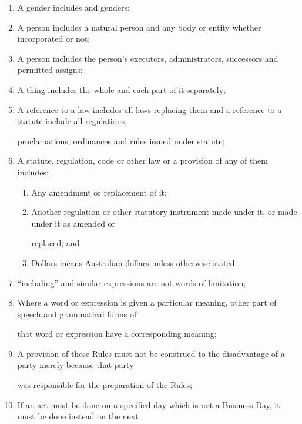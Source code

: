 \documentclass{article}
\begin{document}
\begin{enumerate}[label=\arabic*.]
\begin{enumerate}[label=\arabic{enumi}.\arabic*.]
\begin{enumerate}[label=(\arabic*)]
\item  A gender includes and genders; 

\item  A person includes a natural person and any body or entity whether incorporated or not; 

\item  A person includes the person’s executors, administrators, successors and permitted assigns; 

\item  A thing includes the whole and each part of it separately; 

\item  A reference to a law includes all laws replacing them and a reference to a statute include all regulations, 

proclamations, ordinances and rules issued under statute; 

\item  A statute, regulation, code or other law or a provision of any of them includes: 

\begin{enumerate}[label=(\alph*)]
\item  Any amendment or replacement of it; 

\item  Another regulation or other statutory instrument made under it, or made under it as amended or 

replaced; and 

\item  Dollars means Australian dollars unless otherwise stated. 

\end{enumerate}
\item  “including” and similar expressions are not words of limitation; 

\item  Where a word or expression is given a particular meaning, other part of speech and grammatical forms of 

that word or expression have a corresponding meaning; 

\item  A provision of these Rules must not be construed to the disadvantage of a party merely because that party 

was responsible for the preparation of the Rules; 

\item  If an act must be done on a specified day which is not a Business Day, it must be done instead on the next 


\end{enumerate}
\end{enumerate}
\end{enumerate}
\end{document}
